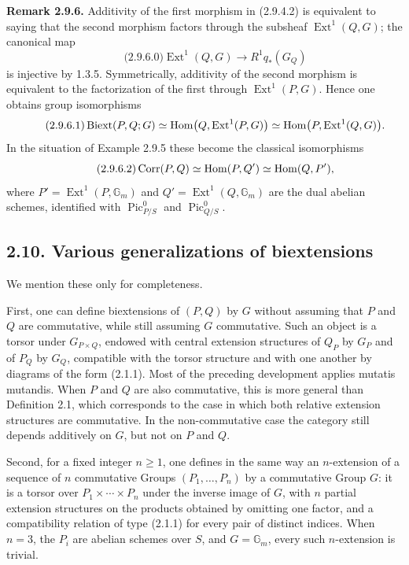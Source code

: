 \documentclass[11pt]{article}
\providecommand{\Pic}{\operatorname{Pic}}
\providecommand{\Ext}{\operatorname{Ext}}
\begin{document}
\textbf{Remark 2.9.6.}  Additivity of the first morphism in (2.9.4.2) is equivalent to saying that the second morphism factors through the subsheaf \(\Ext^1(Q,G)\); the canonical map
\begin{equation}\qquad\text{(2.9.6.0)}
  \Ext^1(Q,G)\longrightarrow R^1q_*(G_Q)
\end{equation}
is injective by 1.3.5.  Symmetrically, additivity of the second morphism is equivalent to the factorization of the first through \(\Ext^1(P,G)\).  Hence one obtains group isomorphisms
\begin{equation}\qquad\text{(2.9.6.1)}
  \Biext(P,Q;G)
  \simeq \operatorname{Hom}\bigl(Q,\Ext^1(P,G)\bigr)
  \simeq \operatorname{Hom}\bigl(P,\Ext^1(Q,G)\bigr).
\end{equation}
In the situation of Example 2.9.5 these become the classical isomorphisms
\begin{equation}\qquad\text{(2.9.6.2)}
  \operatorname{Corr}(P,Q)\simeq \operatorname{Hom}(P,Q')\simeq\operatorname{Hom}(Q,P'),
\end{equation}
where \(P'=\Ext^1(P,\mathbb G_m)\) and \(Q'=\Ext^1(Q,\mathbb G_m)\) are the dual abelian schemes, identified with \(\Pic^0_{P/S}\) and \(\Pic^0_{Q/S}\).

\subsection*{2.10. Various generalizations of biextensions}
We mention these only for completeness.

First, one can define biextensions of \((P,Q)\) by \(G\) without assuming that \(P\) and \(Q\) are commutative, while still assuming \(G\) commutative.  Such an object is a torsor under \(G_{P\times Q}\), endowed with central extension structures of \(Q_P\) by \(G_P\) and of \(P_Q\) by \(G_Q\), compatible with the torsor structure and with one another by diagrams of the form (2.1.1).  Most of the preceding development applies mutatis mutandis.  When \(P\) and \(Q\) are also commutative, this is more general than Definition 2.1, which corresponds to the case in which both relative extension structures are commutative.  In the non-commutative case the category still depends additively on \(G\), but not on \(P\) and \(Q\).

Second, for a fixed integer \(n\geq1\), one defines in the same way an \(n\)-extension of a sequence of \(n\) commutative Groups \((P_1,\ldots,P_n)\) by a commutative Group \(G\): it is a torsor over \(P_1\times\cdots\times P_n\) under the inverse image of \(G\), with \(n\) partial extension structures on the products obtained by omitting one factor, and a compatibility relation of type (2.1.1) for every pair of distinct indices.  When \(n=3\), the \(P_i\) are abelian schemes over \(S\), and \(G=\mathbb G_m\), every such \(n\)-extension is trivial.
\end{document}
